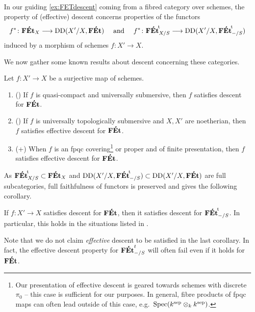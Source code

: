 \begin{ex}
In our guiding \cref{ex:FETdescent} coming from a fibred category over schemes, the property of (effective) descent concerns properties of the functors
\begin{equation}
\label{eq:CechDescentSettingForFEt}
    f^\ast \colon \mathbf{F\acute{E}t}_X \longrightarrow \operatorname{DD}(X'/X, \mathbf{F\acute{E}t}) \quad \textrm{ and } \quad f^\ast \colon {\mathbf{F\acute{E}t}}^{\!\mathrm{t}}_{X/S} \longrightarrow \operatorname{DD}(X'/X, {\mathbf{F\acute{E}t}}^{\!\mathrm{t}}_{-/S})
\end{equation}
induced by a morphism of schemes $f\colon X'\to X$.
\end{ex}
We now gather some known results about descent concerning these categories.
\begin{fact}\label{fact:eff-decent-maps-for-FEt}
    Let $f \colon X' \to X$ be a surjective map of schemes.
\begin{enumerate}
    \item 
    (\cite[IX Corollaire 3.3+Proposition 2.4]{SGA1}) If $f$ is quasi-compact and universally submersive, then $f$ satisfies  descent for $\mathbf{F\acute{E}t}$.
    \item 
    (\cite[Corollary~5.18]{RydhSubmersions}) If $f$ is  universally topologically submersive and $X, X'$ are noetherian, then $f$ satisfies effective descent for $\mathbf{F\acute{E}t}$.
    \item 
    (\cite[IX Proposition~4.1]{SGA1}+\cite[IX Th\'eor\`eme~4.12]{SGA1}) When $f$ is an fpqc covering\footnote{Our presentation of effective descent is geared towards schemes with discrete $\pi_0$ -- this case is sufficient for our purposes. In general, fibre products of fpqc maps can often lead outside of this case, e.g.\ $\operatorname{Spec}(k^{\rm sep}\otimes_k k^{\rm sep})$.} or proper and of finite presentation, then $f$ satisfies effective descent for $\mathbf{F\acute{E}t}$.
\end{enumerate}
\end{fact}
As  ${\mathbf{F\acute{E}t}}^{\!\mathrm{t}}_{X/S} \subset \mathbf{F\acute{E}t}_X$ and $\operatorname{DD}(X'/X, {\mathbf{F\acute{E}t}}^{\!\mathrm{t}}_{-/S}) \subset \operatorname{DD}(X'/X, \mathbf{F\acute{E}t})$ are full subcategories, full faithfulness of functors is preserved and gives the following corollary.
\begin{lem}\label{lem:f-desc-for-FEt-and-FEtt}
    If $f \colon X' \to X$ satisfies descent for $\mathbf{F\acute{E}t}$, then it satisfies descent for ${\mathbf{F\acute{E}t}}^{\!\mathrm{t}}_{-/S}$. In particular, this holds in  the situations listed in .
\end{lem}
Note that we do not claim \emph{effective} descent to be satisfied in the last corollary. In fact, the effective descent property for $\mathbf{F\acute{E}t}^t_{-/S}$ will often fail even if it holds for $\mathbf{F\acute{E}t}$.  


